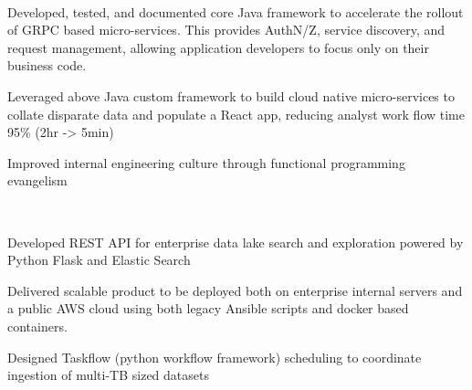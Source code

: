 \documentclass[letterpaper]{deedy-resume-openfont} %
\begin{document}
\begin{minipage}[t]{0.66\textwidth}
\\

\begin{tightitemize}
\item Developed, tested, and documented core Java framework to accelerate the rollout of GRPC based micro-services. This provides AuthN/Z, service discovery, and request management, allowing application developers to focus only on their business code.
\item Leveraged above Java custom framework to build cloud native micro-services to collate disparate data and populate a React app, reducing analyst work flow time 95\% (2hr -> 5min)
\item Improved internal engineering culture through functional programming evangelism

\end{tightitemize}

\\

\begin{tightitemize}
\item Developed REST API for enterprise data lake search and exploration powered by Python Flask and Elastic Search
\item Delivered scalable product to be deployed both on enterprise internal servers and a public AWS cloud using both legacy
Ansible scripts and docker based containers.
\item Designed Taskflow (python workflow framework) scheduling to coordinate ingestion of multi-TB sized datasets

\end{tightitemize}


\end{minipage}
\end{document}
